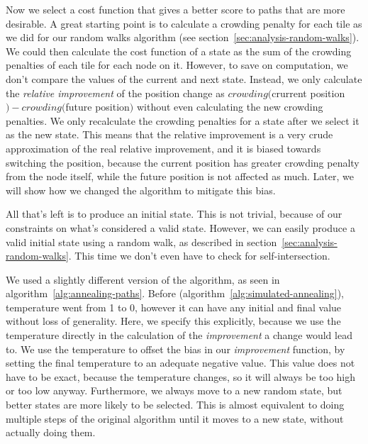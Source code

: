 Now we select a cost function that gives a better score to paths that are more desirable.
A great starting point is to calculate a crowding penalty for each tile as we did for our random walks algorithm (see section~\ref{sec:analysis-random-walks}).
We could then calculate the cost function of a state as the sum of the crowding penalties of each tile for each node on it.
However, to save on computation, we don't compare the values of the current and next state.
Instead, we only calculate the \emph{relative improvement} of the position change as $crowding($crurrent position$) - crowding($future position$)$ without even calculating the new crowding penalties.
We only recalculate the crowding penalties for a state after we select it as the new state.
This means that the relative improvement is a very crude approximation of the real relative improvement, and it is biased towards switching the position, because the current position has greater crowding penalty from the node itself, while the future position is not affected as much.
Later, we will show how we changed the algorithm to mitigate this bias.

All that's left is to produce an initial state.
This is not trivial, because of our constraints on what's considered a valid state.
However, we can easily produce a valid initial state using a random walk, as described in section~\ref{sec:analysis-random-walks}.
This time we don't even have to check for self-intersection.

We used a slightly different version of the algorithm, as seen in algorithm~\ref{alg:annealing-paths}.
Before (algorithm~\ref{alg:simulated-annealing}), temperature went from 1 to 0, however it can have any initial and final value without loss of generality.
Here, we specify this explicitly, because we use the temperature directly in the calculation of the \emph{improvement} a change would lead to.
We use the temperature to offset the bias in our \emph{improvement} function, by setting the final temperature to an adequate negative value.
This value does not have to be exact, because the temperature changes, so it will always be too high or too low anyway.
Furthermore, we always move to a new random state, but better states are more likely to be selected.
This is almost equivalent to doing multiple steps of the original algorithm until it moves to a new state, without actually doing them.

